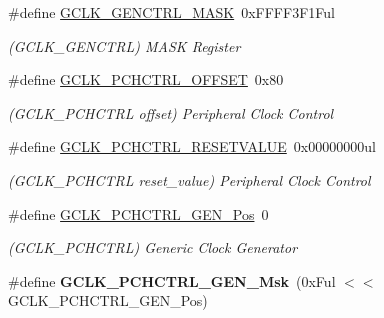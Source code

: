 \begin{DoxyCompactItemize}
\item 
\hypertarget{group___s_a_m_l21___g_c_l_k_gab6d617a227f5a570e43959099ae10b1d}{}\#define \hyperlink{group___s_a_m_l21___g_c_l_k_gab6d617a227f5a570e43959099ae10b1d}{G\+C\+L\+K\+\_\+\+G\+E\+N\+C\+T\+R\+L\+\_\+\+M\+A\+S\+K}~0x\+F\+F\+F\+F3\+F1\+Ful\label{group___s_a_m_l21___g_c_l_k_gab6d617a227f5a570e43959099ae10b1d}

\begin{DoxyCompactList}\small\item\em (G\+C\+L\+K\+\_\+\+G\+E\+N\+C\+T\+R\+L) M\+A\+S\+K Register \end{DoxyCompactList}\item 
\hypertarget{group___s_a_m_l21___g_c_l_k_gac4c23a9218c923b657e8f8a5e09f91bc}{}\#define \hyperlink{group___s_a_m_l21___g_c_l_k_gac4c23a9218c923b657e8f8a5e09f91bc}{G\+C\+L\+K\+\_\+\+P\+C\+H\+C\+T\+R\+L\+\_\+\+O\+F\+F\+S\+E\+T}~0x80\label{group___s_a_m_l21___g_c_l_k_gac4c23a9218c923b657e8f8a5e09f91bc}

\begin{DoxyCompactList}\small\item\em (G\+C\+L\+K\+\_\+\+P\+C\+H\+C\+T\+R\+L offset) Peripheral Clock Control \end{DoxyCompactList}\item 
\hypertarget{group___s_a_m_l21___g_c_l_k_ga9893c3c56f020bbf7f91f4042565cfcc}{}\#define \hyperlink{group___s_a_m_l21___g_c_l_k_ga9893c3c56f020bbf7f91f4042565cfcc}{G\+C\+L\+K\+\_\+\+P\+C\+H\+C\+T\+R\+L\+\_\+\+R\+E\+S\+E\+T\+V\+A\+L\+U\+E}~0x00000000ul\label{group___s_a_m_l21___g_c_l_k_ga9893c3c56f020bbf7f91f4042565cfcc}

\begin{DoxyCompactList}\small\item\em (G\+C\+L\+K\+\_\+\+P\+C\+H\+C\+T\+R\+L reset\+\_\+value) Peripheral Clock Control \end{DoxyCompactList}\item 
\hypertarget{group___s_a_m_l21___g_c_l_k_ga43f3e8ba61616cbd7885f4c9ebfb5942}{}\#define \hyperlink{group___s_a_m_l21___g_c_l_k_ga43f3e8ba61616cbd7885f4c9ebfb5942}{G\+C\+L\+K\+\_\+\+P\+C\+H\+C\+T\+R\+L\+\_\+\+G\+E\+N\+\_\+\+Pos}~0\label{group___s_a_m_l21___g_c_l_k_ga43f3e8ba61616cbd7885f4c9ebfb5942}

\begin{DoxyCompactList}\small\item\em (G\+C\+L\+K\+\_\+\+P\+C\+H\+C\+T\+R\+L) Generic Clock Generator \end{DoxyCompactList}\item 
\hypertarget{group___s_a_m_l21___g_c_l_k_gafa4892aa57b22f8ccb6e5cd720480a89}{}\#define {\bfseries G\+C\+L\+K\+\_\+\+P\+C\+H\+C\+T\+R\+L\+\_\+\+G\+E\+N\+\_\+\+Msk}~(0x\+Ful $<$$<$ G\+C\+L\+K\+\_\+\+P\+C\+H\+C\+T\+R\+L\+\_\+\+G\+E\+N\+\_\+\+Pos)\label{group___s_a_m_l21___g_c_l_k_gafa4892aa57b22f8ccb6e5cd720480a89}


\end{DoxyCompactItemize}
